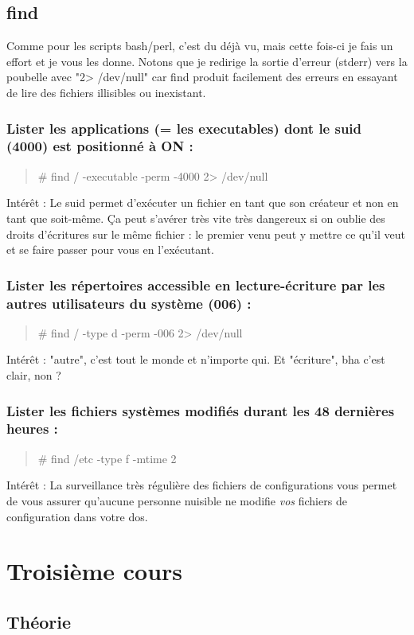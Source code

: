 \documentclass[a4paper,11pt]{article}
\newcommand{\commande}[1] {
    \begin{quote}
    \tt\raggedright #1 
    \end{quote}
}
\begin{document}
\subsection{find}
\par Comme pour les scripts bash/perl, c'est du déjà vu, mais cette fois-ci je fais un effort et je vous les donne. Notons que je redirige la sortie d'erreur (stderr) vers la poubelle avec "2> /dev/null" car find produit facilement des erreurs en essayant de lire des fichiers illisibles ou inexistant.
\subsubsection*{Lister les applications (= les executables) dont le suid (4000) est positionné à ON :}
\commande{\# find / -executable -perm -4000 2> /dev/null}
\par Intérêt : Le suid permet d'exécuter un fichier en tant que son créateur et non en tant que soit-même. Ça peut s'avérer très vite très dangereux si on oublie des droits d'écritures sur le même fichier : le premier venu peut y mettre ce qu'il veut et se faire passer pour vous en l'exécutant.
\subsubsection*{Lister les répertoires accessible en lecture-écriture par les autres utilisateurs du système (006) :}
\commande{\# find / -type d -perm -006 2> /dev/null}
\par Intérêt : "autre", c'est tout le monde et n'importe qui. Et "écriture", bha c'est clair, non ?
\subsubsection*{Lister les fichiers systèmes modifiés durant les 48 dernières heures :}
\commande{\# find /etc -type f -mtime 2}
\par Intérêt : La surveillance très régulière des fichiers de configurations vous permet de vous assurer qu'aucune personne nuisible ne modifie \emph{vos} fichiers de configuration dans votre dos.

\section{Troisième cours}
\subsection{Théorie}
\end{document}
